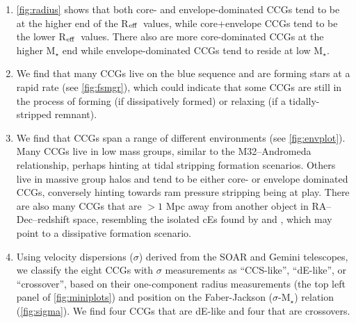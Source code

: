 \documentclass[iop,apj]{emulateapj}
\newcommand{\Reff}{R$_{\rm eff}$}
\begin{document}
\begin{enumerate}
\item \autoref{fig:radius} shows that both core- and envelope-dominated CCGs tend to be at the higher end of the \Reff\ values, while core+envelope CCGs tend to be the lower \Reff\ values. There also are more core-dominated CCGs at the higher M$_{\star}$ end while envelope-dominated CCGs tend to reside at low M$_{\star}$.

\item We find that many CCGs live on the blue sequence and are forming stars at a rapid rate (see \autoref{fig:fsmgr}), which could indicate that some CCGs are still in the process of forming (if dissipatively formed) or relaxing (if a tidally-stripped remnant).

\item We find that CCGs span a range of different environments (see \autoref{fig:envplot}). Many CCGs live in low mass groups, similar to the M32--Andromeda relationship, perhaps hinting at tidal stripping formation scenarios. Others live in massive group halos and tend to be either core- or envelope dominated CCGs, conversely hinting towards ram pressure stripping being at play. There are also many CCGs that are $>1$ Mpc away from another object in RA--Dec--redshift space, resembling the isolated cEs found by \citet{Huxor2013} and \citet{Paudel2014}, which may point to a dissipative formation scenario.

\item Using velocity dispersions ($\sigma$) derived from the SOAR and Gemini telescopes, we classify the eight CCGs with $\sigma$ measurements as ``CCS-like'', ``dE-like'', or ``crossover'', based on their one-component radius measurements (the top left panel of \autoref{fig:miniplots}) and position on the Faber-Jackson ($\sigma$-M$_{\star}$) relation (\autoref{fig:sigma}). We find four CCGs that are dE-like and four that are crossovers.


\end{enumerate}
\end{document}
